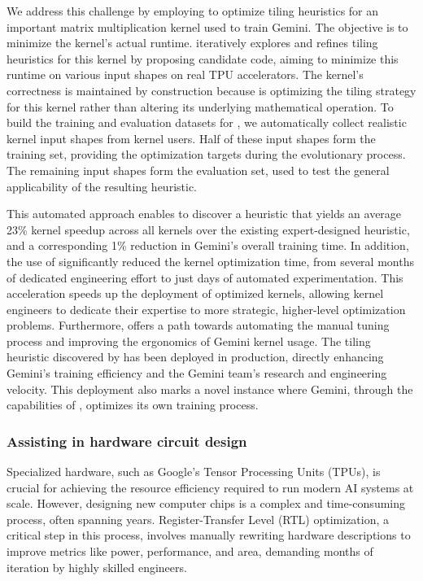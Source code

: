 We address this challenge by employing \method to optimize tiling heuristics for an important matrix multiplication kernel used to train Gemini. The objective is to minimize the kernel's actual runtime. \method iteratively explores and refines tiling heuristics for this kernel by proposing candidate code, aiming to minimize this runtime on various input shapes on real TPU accelerators. The kernel’s correctness is maintained by construction because \method is optimizing the tiling strategy for this kernel rather than altering its underlying mathematical operation. To build the training and evaluation datasets for \method, we automatically collect realistic kernel input shapes from kernel users. Half of these input shapes form the training set, providing the optimization targets during the evolutionary process. The remaining input shapes form the evaluation set, used to test the general applicability of the resulting heuristic.

This automated approach enables \method to discover a heuristic that yields an average 23\% kernel speedup across all kernels over the existing expert-designed heuristic, and a corresponding 1\% reduction in Gemini’s overall training time. In addition, the use of \method significantly reduced the kernel optimization time, from several months of dedicated engineering effort to just days of automated experimentation. This acceleration speeds up the deployment of optimized kernels, allowing kernel engineers to dedicate their expertise to more strategic, higher-level optimization problems. Furthermore, \method offers a path towards automating the manual tuning process and improving the ergonomics of Gemini kernel usage. The tiling heuristic discovered by \method has been deployed in production, directly enhancing Gemini's training efficiency and the Gemini team’s research and engineering velocity. This deployment also marks a novel instance where Gemini, through the capabilities of \method, optimizes its own training process.


\subsubsection{Assisting in hardware circuit design}

Specialized hardware, such as Google's Tensor Processing Units (TPUs), is crucial for achieving the resource efficiency required to run modern AI systems at scale. However, designing new computer chips is a complex and time-consuming process, often spanning years. Register-Transfer Level (RTL) optimization, a critical step in this process, involves manually rewriting hardware descriptions to improve metrics like power, performance, and area, demanding months of iteration by highly skilled engineers.

